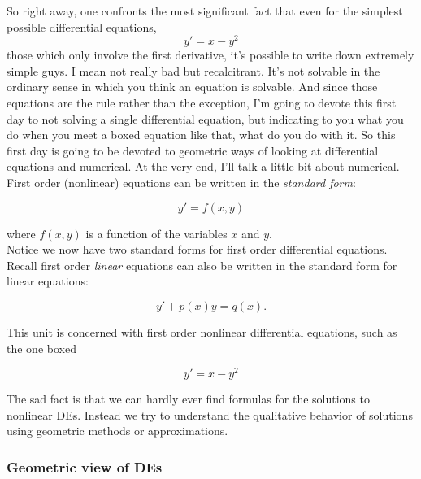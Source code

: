 So right away, one confronts the most significant fact
that even for the simplest possible differential
equations,
\begin{equation*}
  \boxed{y' = x - y^2}
\end{equation*}
those which only involve the first derivative,
it's possible to write down extremely simple guys.
I mean not really bad but recalcitrant.
It's not solvable in the ordinary sense in which you
think an equation is solvable.
And since those equations are the rule rather than
the exception, I'm going to devote this first day
to not solving a single differential equation,
but indicating to you what you do
when you meet a boxed equation like that,
what do you do with it.
So this first day is going to be devoted
to geometric ways of looking at differential equations
and numerical.
At the very end, I'll talk a little bit about numerical.\\

First order (nonlinear) equations can be written in the \emph{\color{blue} standard form}:

\begin{equation*}
  y' = f(x,y)
\end{equation*}

where $f(x, y)$ is a function of the variables $x$ and $y$. \\

Notice we now have two standard forms for first order differential equations.
Recall first order \emph{\color{blue}linear} equations
can also be written in the standard form for linear equations:

\begin{equation*}
  y'+p(x)y=q(x).
\end{equation*}


This unit is concerned with first order nonlinear differential equations, such as the one boxed

\begin{equation*}
  \boxed{y' = x - y^2}
\end{equation*}

The sad fact is that we can hardly ever find formulas for the solutions to nonlinear DEs.
Instead we try to understand the qualitative behavior of solutions using geometric methods or approximations.
\clearpage

\subsubsection{Geometric view of DEs}

